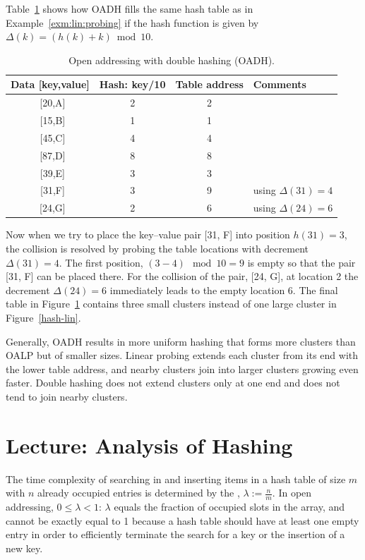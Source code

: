 \begin{Example}\label{exm:double:hashing}
Table~\ref{hash-dbl} shows how OADH fills the same hash table as in
Example~\ref{exm:lin:probing} if the 
hash function is given by \(\Delta(k) = (h(k) + k) \bmod 10\).

\begin{table}[hbt]
\begin{center}
\caption{\label{hash-dbl} Open addressing with double hashing (OADH).}
\begin{tabular}{|c|c|c|l|} \hline 
\textbf{Data} [key,value] & \textbf{Hash}: key/10 & \textbf{Table address} & \textbf{Comments} \\ \hline
~[20,A] & 2 & 2 & \\
~[15,B] & 1 & 1 & \\
~[45,C] & 4 & 4 & \\
~[87,D] & 8 & 8 & \\
~[39,E] & 3 & 3 & \\
~[31,F] & 3 & 9 & using $\Delta(31)=4$ \\
~[24,G] & 2 & 6 & using $\Delta(24)=6$ \\ \hline
\end{tabular}
\end{center}
\end{table}

Now when we try to place the key--value 
pair [31, F] into position \(h(31) = 3\), the collision 
is resolved by probing the table locations with decrement
\(\Delta(31) = 4\). The first position, \((3-4)\mod 10 = 9\) is
empty so that the pair [31, F] can be placed there. 
For the collision of the pair, [24, G], at location 2 
the decrement \(\Delta(24) = 6\) immediately leads to
the empty location $6$. The final table
in Figure~\ref{hash-dbl} contains three small clusters 
instead of one large
cluster in Figure~\ref{hash-lin}. 
\end{Example}

Generally, OADH results in more uniform hashing that
forms more clusters than OALP but of smaller sizes.
Linear probing extends each cluster from its end with
the lower table address, and nearby clusters join into
larger clusters growing even faster. Double hashing does
not extend clusters only at one end and does not tend
to join nearby clusters.


\chapter{Lecture: Analysis of Hashing}
The time complexity of searching in and inserting items in a
hash table of size \(m\) with
\(n\) already occupied entries is determined by the ,
  \(\lambda := \frac{n}{m}\). In open addressing, \(0 \le \lambda < 1\): $\lambda$
  equals the fraction of occupied
slots in the array, and cannot be exactly equal to 1 because a hash table 
should have at least one empty entry in order to efficiently terminate the search 
for a key or the insertion of a new key.

